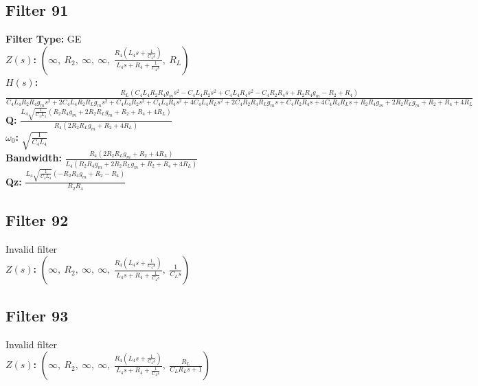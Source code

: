 \documentclass{article}
\begin{document}
\subsection*{Filter 91}
\textbf{Filter Type:} GE \\ 
\textbf{$Z(s)$:} $\left( \infty, \  R_{2}, \  \infty, \  \infty, \  \frac{R_{4} \left(L_{4} s + \frac{1}{C_{4} s}\right)}{L_{4} s + R_{4} + \frac{1}{C_{4} s}}, \  R_{L}\right)$ \\ 
\textbf{$H(s)$:} $\frac{R_{L} \left(C_{4} L_{4} R_{2} R_{4} g_{m} s^{2} - C_{4} L_{4} R_{2} s^{2} + C_{4} L_{4} R_{4} s^{2} - C_{4} R_{2} R_{4} s + R_{2} R_{4} g_{m} - R_{2} + R_{4}\right)}{C_{4} L_{4} R_{2} R_{4} g_{m} s^{2} + 2 C_{4} L_{4} R_{2} R_{L} g_{m} s^{2} + C_{4} L_{4} R_{2} s^{2} + C_{4} L_{4} R_{4} s^{2} + 4 C_{4} L_{4} R_{L} s^{2} + 2 C_{4} R_{2} R_{4} R_{L} g_{m} s + C_{4} R_{2} R_{4} s + 4 C_{4} R_{4} R_{L} s + R_{2} R_{4} g_{m} + 2 R_{2} R_{L} g_{m} + R_{2} + R_{4} + 4 R_{L}}$ \\ 
\textbf{Q:} $\frac{L_{4} \sqrt{\frac{1}{C_{4} L_{4}}} \left(R_{2} R_{4} g_{m} + 2 R_{2} R_{L} g_{m} + R_{2} + R_{4} + 4 R_{L}\right)}{R_{4} \left(2 R_{2} R_{L} g_{m} + R_{2} + 4 R_{L}\right)}$ \\ 
\textbf{$\omega_0$:} $\sqrt{\frac{1}{C_{4} L_{4}}}$ \\ 
\textbf{Bandwidth:} $\frac{R_{4} \left(2 R_{2} R_{L} g_{m} + R_{2} + 4 R_{L}\right)}{L_{4} \left(R_{2} R_{4} g_{m} + 2 R_{2} R_{L} g_{m} + R_{2} + R_{4} + 4 R_{L}\right)}$ \\ 
\textbf{Qz:} $\frac{L_{4} \sqrt{\frac{1}{C_{4} L_{4}}} \left(- R_{2} R_{4} g_{m} + R_{2} - R_{4}\right)}{R_{2} R_{4}}$ \\ 
\subsection*{Filter 92}
Invalid filter \\ 
\textbf{$Z(s)$:} $\left( \infty, \  R_{2}, \  \infty, \  \infty, \  \frac{R_{4} \left(L_{4} s + \frac{1}{C_{4} s}\right)}{L_{4} s + R_{4} + \frac{1}{C_{4} s}}, \  \frac{1}{C_{L} s}\right)$ \\ 
\subsection*{Filter 93}
Invalid filter \\ 
\textbf{$Z(s)$:} $\left( \infty, \  R_{2}, \  \infty, \  \infty, \  \frac{R_{4} \left(L_{4} s + \frac{1}{C_{4} s}\right)}{L_{4} s + R_{4} + \frac{1}{C_{4} s}}, \  \frac{R_{L}}{C_{L} R_{L} s + 1}\right)$ \\ 
\end{document}
